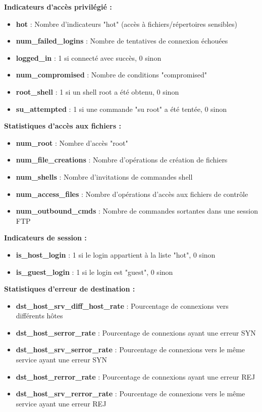 \textbf{Indicateurs d'accès privilégié :}
\begin{itemize}
    \item \textbf{hot} : Nombre d'indicateurs "hot" (accès à fichiers/répertoires sensibles)
    \item \textbf{num\_failed\_logins} : Nombre de tentatives de connexion échouées
    \item \textbf{logged\_in} : 1 si connecté avec succès, 0 sinon
    \item \textbf{num\_compromised} : Nombre de conditions "compromised"
    \item \textbf{root\_shell} : 1 si un shell root a été obtenu, 0 sinon
    \item \textbf{su\_attempted} : 1 si une commande "su root" a été tentée, 0 sinon
\end{itemize}

\textbf{Statistiques d'accès aux fichiers :}
\begin{itemize}
    \item \textbf{num\_root} : Nombre d'accès "root"
    \item \textbf{num\_file\_creations} : Nombre d'opérations de création de fichiers
    \item \textbf{num\_shells} : Nombre d'invitations de commandes shell
    \item \textbf{num\_access\_files} : Nombre d'opérations d'accès aux fichiers de contrôle
    \item \textbf{num\_outbound\_cmds} : Nombre de commandes sortantes dans une session FTP
\end{itemize}

\textbf{Indicateurs de session :}
\begin{itemize}
    \item \textbf{is\_host\_login} : 1 si le login appartient à la liste "hot", 0 sinon
    \item \textbf{is\_guest\_login} : 1 si le login est "guest", 0 sinon
\end{itemize}

\textbf{Statistiques d'erreur de destination :}
\begin{itemize}
    \item \textbf{dst\_host\_srv\_diff\_host\_rate} : Pourcentage de connexions vers différents hôtes
    \item \textbf{dst\_host\_serror\_rate} : Pourcentage de connexions ayant une erreur SYN
    \item \textbf{dst\_host\_srv\_serror\_rate} : Pourcentage de connexions vers le même service ayant une erreur SYN
    \item \textbf{dst\_host\_rerror\_rate} : Pourcentage de connexions ayant une erreur REJ
    \item \textbf{dst\_host\_srv\_rerror\_rate} : Pourcentage de connexions vers le même service ayant une erreur REJ
\end{itemize}

